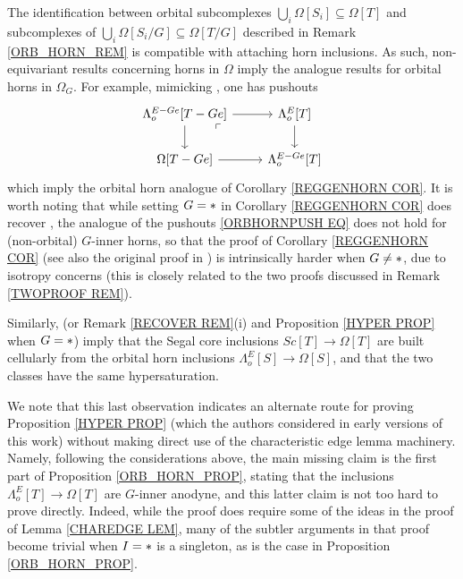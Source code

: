 \documentclass[a4paper,10pt
 ,draft
]{article}%
\begin{document}
\begin{remark}
	The identification between orbital subcomplexes 
	$\bigcup_i \Omega[S_i] \subseteq \Omega[T]$ and subcomplexes of 
	$\bigcup_i \Omega[S_i/G] \subseteq \Omega[T/G]$
	described in Remark \ref{ORB_HORN_REM}
	is compatible with attaching horn inclusions.
	As such, non-equivariant results concerning horns in $\Omega$
	imply the analogue results for orbital horns in $\Omega_G$. For example, mimicking \cite[Lemma 5.1]{MW09}, one has pushouts	
\begin{equation}\label{ORBHORNPUSH EQ}
\begin{tikzcd}
	\Lambda^{E - G e}_o[T - Ge] \arrow[r] \arrow[d]
	\arrow[dr, phantom, "\ulcorner", very near start] &
	\Lambda^{E}_o[T] \arrow[d]
\\
	\Omega[T - G e] \arrow[r]&
	\Lambda^{E - G e}_o[T]
\end{tikzcd}
\end{equation}	
which imply the orbital horn analogue of 
Corollary \ref{REGGENHORN COR}.
It is worth noting that while setting $G=\**$ in 
Corollary \ref{REGGENHORN COR} does recover
\cite[Lemma 5.1]{MW09}, 
the analogue of the pushouts \eqref{ORBHORNPUSH EQ}
does not hold for (non-orbital) $G$-inner horns,
so that the proof of Corollary \ref{REGGENHORN COR}
(see also the original proof in \cite[Prop. 6.17]{Per18})
is intrinsically harder when $G \neq \**$,
due to isotropy concerns (this is closely related to the two proofs discussed in Remark \ref{TWOPROOF REM}).

Similarly, \cite[Props. 2.4 and 2.5]{CM13a} 
(or Remark \ref{RECOVER REM}(i) and Proposition \ref{HYPER PROP} when $G=\**$)
imply that the Segal core inclusions 
$Sc[T] \to \Omega[T]$
are built cellularly from the orbital horn inclusions
$\Lambda^E_o[S] \to \Omega[S]$, and that the two classes have the same hypersaturation. 

	We note that this last observation indicates an alternate route for proving Proposition \ref{HYPER PROP}
	(which the authors considered in early versions of this work)
	without making direct use of the characteristic edge lemma machinery.
	Namely, following the considerations above, the main missing claim is the first part of Proposition \ref{ORB_HORN_PROP}, stating that the inclusions
	$\Lambda^E_o[T] \to \Omega[T]$ are $G$-inner anodyne, and this latter claim is not too hard to prove directly. 
	Indeed, while the proof does require some of the ideas in the proof of Lemma \ref{CHAREDGE LEM},
	many of the subtler arguments in that proof
	become trivial when $I=\**$ is a singleton, as is the case in Proposition \ref{ORB_HORN_PROP}.
\end{remark}
\end{document}
